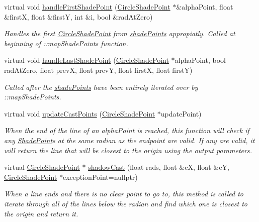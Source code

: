 \begin{DoxyCompactItemize}
\item 
virtual void \hyperlink{classlighting_1_1CircleLightSource_a228a02c6c4064d349d0471d86d4c177d}{handle\+First\+Shade\+Point} (\hyperlink{classlighting_1_1CircleShadePoint}{Circle\+Shade\+Point} $\ast$\&alpha\+Point, float \&firstX, float \&firstY, int \&i, bool \&rad\+At\+Zero)
\begin{DoxyCompactList}\small\item\em Handles the first \hyperlink{classlighting_1_1CircleShadePoint}{Circle\+Shade\+Point} from \hyperlink{classlighting_1_1CircleLightSource_acdfea64be9d142f669338c5e206e753e}{shade\+Points} appropiatly. Called at beginning of \+::map\+Shade\+Points function. \end{DoxyCompactList}\item 
virtual void \hyperlink{classlighting_1_1CircleLightSource_aa31a12e3693654b21ee7e19acd067cf1}{handle\+Last\+Shade\+Point} (\hyperlink{classlighting_1_1CircleShadePoint}{Circle\+Shade\+Point} $\ast$alpha\+Point, bool rad\+At\+Zero, float prevX, float prevY, float firstX, float firstY)
\begin{DoxyCompactList}\small\item\em Called after the \hyperlink{classlighting_1_1CircleLightSource_acdfea64be9d142f669338c5e206e753e}{shade\+Points} have been entirely iterated over by \+::map\+Shade\+Points. \end{DoxyCompactList}\item 
virtual void \hyperlink{classlighting_1_1CircleLightSource_a9a8312eb2e60e2a0c8b472d226b0600f}{update\+Cast\+Points} (\hyperlink{classlighting_1_1CircleShadePoint}{Circle\+Shade\+Point} $\ast$update\+Point)
\begin{DoxyCompactList}\small\item\em When the end of the line of an alpha\+Point is reached, this function will check if any \hyperlink{classlighting_1_1ShadePoint}{Shade\+Point}s at the same radian as the endpoint are valid. If any are valid, it will return the line that will be closest to the origin using the output parameters. \end{DoxyCompactList}\item 
virtual \hyperlink{classlighting_1_1CircleShadePoint}{Circle\+Shade\+Point} $\ast$ \hyperlink{classlighting_1_1CircleLightSource_a57f45ad27f3863aa6834a13ee71c88c5}{shadow\+Cast} (float rads, float \&cX, float \&cY, \hyperlink{classlighting_1_1CircleShadePoint}{Circle\+Shade\+Point} $\ast$exception\+Point=nullptr)
\begin{DoxyCompactList}\small\item\em When a line ends and there is no clear point to go to, this method is called to iterate through all of the lines below the radian and find which one is closest to the origin and return it. \end{DoxyCompactList}\item 

\end{DoxyCompactItemize}
